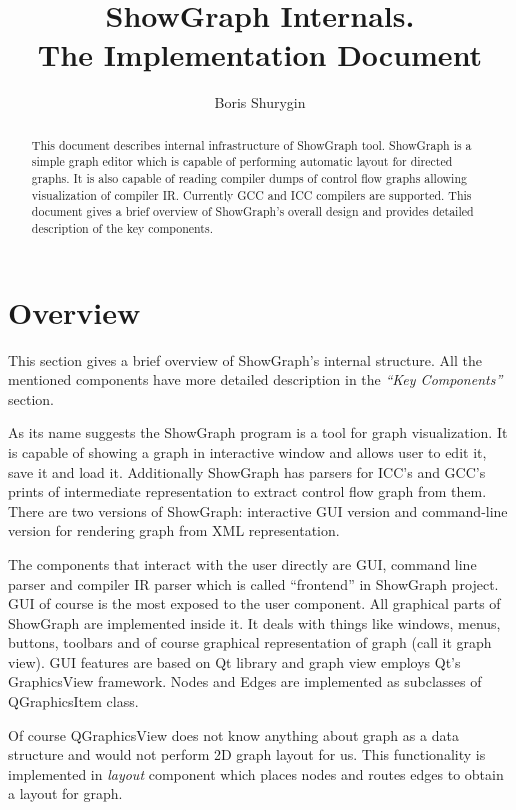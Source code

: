 \documentclass[11pt,twoside,a4paper]{article}
\begin{document}
 
\lstset{language=[Visual]C++}

\title{ShowGraph Internals.\\ \textsf{The Implementation Document}}
\author{Boris Shurygin}

\maketitle
\begin{abstract}
This document describes internal infrastructure of ShowGraph tool. ShowGraph is a simple graph editor which is capable of performing automatic layout for directed graphs. It is also capable of reading compiler dumps of control flow graphs allowing visualization of compiler IR. Currently GCC and ICC compilers are supported. This document gives a brief overview of ShowGraph's overall design and provides detailed description of the key components.
\end{abstract}
\tableofcontents
\section{Overview}
This section gives a brief overview of ShowGraph's internal structure. All the mentioned components have more detailed description in the \emph{``Key Components''} section.

As its name suggests the ShowGraph program is a tool for graph visualization. It is capable of showing a graph in interactive window and allows user to edit it, save it and load it. Additionally ShowGraph has parsers for ICC's and GCC's prints of intermediate representation to extract control flow graph from them. There are two versions of ShowGraph: interactive GUI version and command-line version for rendering graph from XML representation.

The components that interact with the user directly are GUI, command line parser and compiler IR parser which is called ``frontend'' in ShowGraph project. GUI of course is the most exposed to the user component. All graphical parts of ShowGraph are implemented inside it. It deals with things like windows, menus, buttons, toolbars and of course graphical representation of graph (call it graph view). GUI features are based on Qt library and graph view employs Qt's GraphicsView framework. Nodes and Edges are implemented as subclasses of QGraphicsItem class.

Of course QGraphicsView does not know anything about graph as a data structure and would not perform 2D graph layout for us. This functionality is implemented in \emph{layout} component which places nodes and routes edges to obtain a layout for graph.
\end{document}
